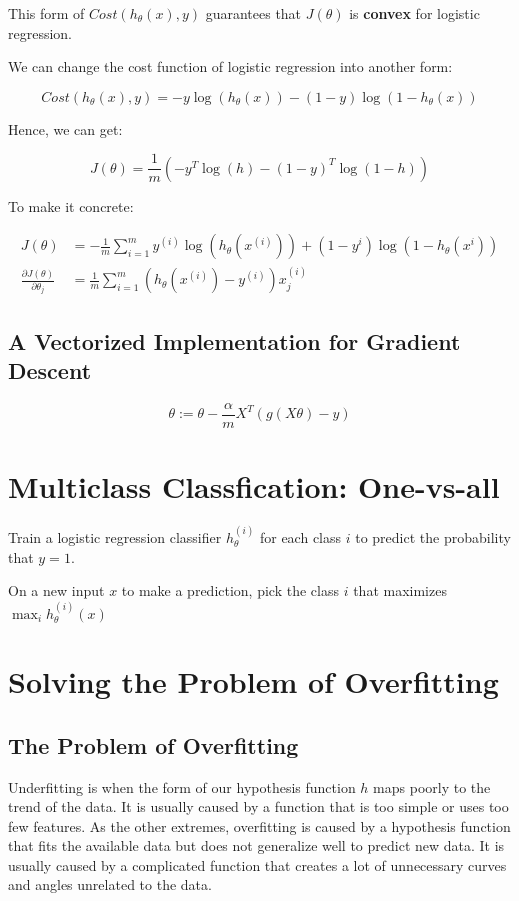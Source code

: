 \documentclass[11pt]{article}
\begin{document}
			This form of $Cost(h_{\theta}(x) ,y)$ guarantees that $J(\theta)$ is \textbf{convex} for logistic regression.
			
			We can change the cost function of logistic regression into another form:
			
			$$
			Cost(h_{\theta}(x) ,y)= -y\log(h_{\theta}(x)) - (1-y)\log(1- h_{\theta}(x))
			$$
			
			Hence, we can get:
			
			$$
			J(\theta) = \frac{1}{m}(-y^{T}\log(h) - (1-y)^{T}\log (1-h))
			$$
			
			To make it concrete:
			
			\begin{center}
				\begin{align}
					J(\theta) &=- \frac{1}{m} \sum_{i=1}^{m} y^{(i)}\log(h_{\theta}(x^{(i)})) + (1-y^{i})\log (1-h_{\theta}(x^{i})) \\
					\frac{\partial J(\theta)}{\partial \theta _j} &= \frac{1}{m} \sum_{i=1}^{m} (h_{\theta}(x^{(i)}) - y^{(i)}) x_{j}^{(i)}
				\end{align}
			\end{center}
			
		\subsection{A Vectorized Implementation for Gradient Descent}
		$$
		\theta := \theta - \frac{\alpha}{m} X^{T}(g(X\theta) - y)
		$$
	
	\section{Multiclass Classfication: One-vs-all}
	
	Train a logistic regression classifier $h_{\theta}^{(i)}$ for each class $i$ to predict the probability that $y = 1$.
	
	On a new input $x$ to make a prediction, pick the class $i$ that maximizes $\max_{i} h_{\theta}^{(i)}(x)$
	
	\section{Solving the Problem of Overfitting}
	
		\subsection{The Problem of Overfitting}
			Underfitting is when the form of our hypothesis function $h$ maps poorly to the trend of the data. It is usually caused by a function that is too simple or uses too few features. As the other extremes, overfitting is caused by a hypothesis function that fits the available data but does not generalize well to predict new data. It is usually caused by a complicated function that creates a lot of unnecessary curves and angles unrelated to the data.
			
\end{document}
